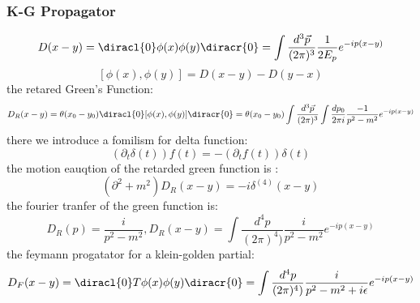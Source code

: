 \subsubsection{K-G Propagator}
\[D(x-y)=\diracl{0}\phi(x)\phi(y)\diracr{0}=\int \frac{d^3\vec{p}}{(2\pi)^3}\frac{1}{2E_p}e^{-ip(x-y)}\]
\[[\phi(x),\phi(y)]=D(x-y)-D(y-x)\]
the retared Green's Function:
\[D_R(x-y)=\theta(x_0-y_0)\diracl{0}[\phi(x),\phi(y)]\diracr{0}=\theta(x_0-y_0)\int \frac{d^3\vec{p}}{(2\pi)^3}\int \frac{dp_0}{2\pi i}\frac{-1}{p^2-m^2}e^{-ip(x-y)}\]
there we introduce a fomilism for delta function:
\[(\partial_t \delta(t))f(t)=-(\partial_t f(t))\delta(t)\]
the motion eauqtion of the retarded green function is :
\[(\partial^2+m^2)D_R(x-y)=-i\delta^{(4)}(x-y)\]
the fourier tranfer of the green function is:
\[D_R(p)=\frac{i}{p^2-m^2},D_R(x-y)=\int \frac{d^4p}{(2\pi)^4)}\frac{i}{p^2-m^2}e^{-ip(x-y)}\]
the feymann progatator for a klein-golden partial:
\[D_F(x-y)=\diracl{0}T\phi(x)\phi(y)\diracr{0}=\int \frac{d^4p}{(2\pi)^4)}\frac{i}{p^2-m^2+i\epsilon}e^{-ip(x-y)}\]

